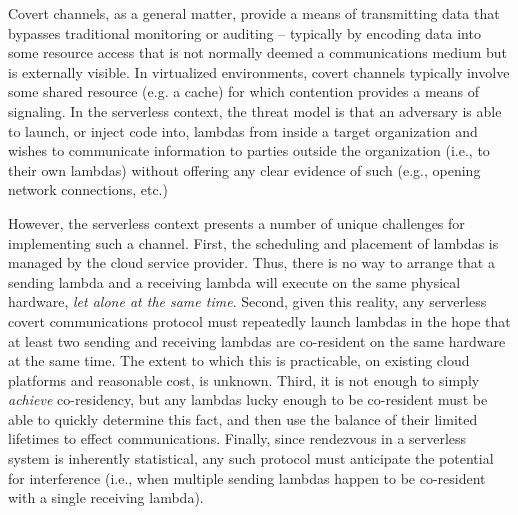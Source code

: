 Covert channels, as a general matter, provide a means of transmitting
data that bypasses traditional monitoring or auditing -- typically by
encoding data into some resource access that is not normally deemed a
communications medium but is externally visible.  In virtualized
environments, covert channels typically involve some shared resource
(e.g. a cache) for which contention provides a means of signaling.
In the serverless context, the threat model is that an adversary is
able to launch, or inject code into, lambdas from inside a target
organization and wishes to communicate information to parties outside
the organization (i.e., to their own lambdas) without offering any
clear evidence of such (e.g., opening network connections, etc.)

However, the serverless context presents a number of unique challenges for
implementing such a channel.  First, the scheduling and placement of lambdas is
managed by the cloud service provider.  Thus, there is no way to arrange that a
sending lambda and a receiving lambda will execute on the same physical
hardware, \emph{let alone at the same time}.  Second, given this reality, any
serverless covert communications protocol must repeatedly launch lambdas in the
hope that at least two sending and receiving lambdas are co-resident on the same
hardware at the same time.  The extent to which this is practicable, on existing
cloud platforms and reasonable cost, is unknown.  Third, it is not enough to
simply \emph{achieve} co-residency, but any lambdas lucky enough to be
co-resident must be able to quickly determine this fact, and then use the
balance of their limited lifetimes to effect communications.  Finally, since
rendezvous in a serverless system is inherently statistical, any such protocol
must anticipate the potential for interference (i.e., when multiple sending
lambdas happen to be co-resident with a single receiving lambda).

